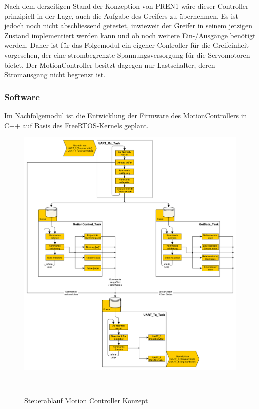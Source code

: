 \documentclass[main.tex]{subfiles} %
\begin{document}
Nach dem derzeitigen Stand der Konzeption von PREN1 wäre dieser Controller
prinzipiell in der Lage, auch die Aufgabe des Greifers zu übernehmen. Es ist
jedoch noch nicht abschliessend getestet, inwieweit der Greifer in seinem
jetzigen Zustand implementiert werden kann und ob noch weitere Ein-/Ausgänge
benötigt werden. Daher ist für das Folgemodul ein eigener Controller für die
Greifeinheit vorgesehen, der eine strombegrenzte Spannungsversorgung für die
Servomotoren bietet. Der MotionController besitzt dagegen nur Lastschalter,
deren Stromausgang nicht begrenzt ist.

\subsubsection*{Software}

Im Nachfolgemodul ist die Entwicklung der Firmware des MotionControllers in C++
auf Basis des FreeRTOS-Kernels geplant.

\begin{figure}[H]
    \centering
    \includegraphics[width = 1\linewidth]{fig_Antriebe_und_Dimensionierung/Konzept_Steuerablauf.pdf}
    \caption{Steuerablauf Motion Controller Konzept}~\label{fig:MotionController_Firmware}
\end{figure}
\end{document}

